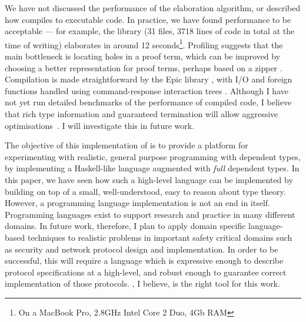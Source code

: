 We have not discussed the performance of the elaboration
algorithm, or described how \Idris{} compiles to executable code. In practice,
we have found performance to be acceptable --- for example, the \Idris{}
library (31 files, 3718 lines of code in total at the time of writing)
elaborates in around 12 seconds\footnote{On a MacBook Pro, 2.8GHz Intel Core 2
Duo, 4Gb RAM}. Profiling suggests that the main bottleneck is locating holes
in a proof term, which can be improved by choosing a better representation
for proof terms, perhaps based on a zipper \cite{Huet1997}. Compilation is made
straightforward by the Epic library \cite{brady2011epic}, with I/O and foreign
functions handled using command-response interaction trees \cite{Hancock2000}.
Although I have not yet run detailed benchmarks of the performance of compiled
code, I believe that rich type information and guaranteed termination will
allow aggressive optimisations~\cite{Brady2003,Brady2005}. I will investigate
this in future work.

The objective of this implementation of \Idris{} is to provide a platform
for experimenting with realistic, general purpose programming with dependent
types, by implementing a Haskell-like language augmented with \emph{full}
dependent types. 
In this paper, we have seen how such a high-level language can be implemented
by building on top of a small, well-understood, easy to reason about type
theory. 
However, a programming language implementation is not an end in itself. 
Programming languages exist to support research and practice in many different
domains. In future work, therefore, I plan to apply domain specific
language-based techniques to realistic problems in important safety critical
domains such as security and network protocol design and implementation. In
order to be successful, this will require a language which is expressive enough
to describe protocol specifications at a high-level, and robust enough to
guarantee correct implementation of those protocols. \Idris{}, I believe, is
the right tool for this work.

